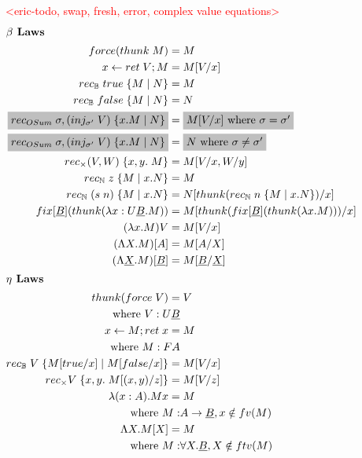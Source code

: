 \documentclass[acmsmall]{acmart}
\newcommand{\eric}[1]{\textcolor{red}{ <eric-#1> }}
\begin{document}
\begin{figure}[H]
  \eric{todo, swap, fresh, error, complex value equations}
  \centering
  \scriptsize
  \begin{align*}
  \intertext{$\textbf{$\beta$ Laws}$}
  force (thunk \; M) =&\; M\\
  x \leftarrow ret \; V; M =&\; M[V/x]\\
  rec_{\mathbb{B}} \; true \; \{M \;|\; N\} =&\; M \\
  rec_{\mathbb{B}} \; false \; \{M \;|\; N\} =&\; N \\
  \colorbox{lightgray}{$rec_{OSum}\; \sigma,(inj_{\sigma'}\;V)\;\{x.M \;|\; N\}$} =&\; \colorbox{lightgray}{$M[V/x] \text{ where } \sigma = \sigma'$}\\
  \colorbox{lightgray}{$rec_{OSum}\; \sigma,(inj_{\sigma'}\;V)\;\{x.M \;|\; N\}$} =&\; \colorbox{lightgray}{$N \text{ where } \sigma \neq \sigma'$}\\
  rec_\times (V,W)\;\{x,y.\;M\} =&\; M[V/x,W/y]\\
  rec_{\mathbb{N}} \; z \; \{M \;|\;x. N\} =&\; M \\
  rec_{\mathbb{N}} \; (s\;n) \; \{M \;|\;x. N\} =&\; N[thunk(rec_{\mathbb{N}} \; n \; \{M \;|\;x. N\})/x] \\
  fix[\underline{B}](thunk(\lambda x : U\underline{B}. M)) =&\;M[thunk(fix[\underline{B}](thunk(\lambda x. M)))/x]\\
  (\lambda x.M)V =&\; M[V/x]\\
  (\Lambda X.M)[A] =&\; M[A/X] \\
  (\Lambda \underline{X}.M)[\underline{B}] =&\; M[\underline{B}/\underline{X}]\\
  \intertext{$\textbf{$\eta$ Laws}$} 
    thunk(force \;V) =&\; V \\
    \text{ where } V : U\underline{B}\\
    x \leftarrow M; ret \; x =&\; M\\
    \text{ where } M : FA \\
    rec_{\mathbb{B}} \; V \; \{M[true/x] \;|\; M[false/x]\} =&\; M[V/x]\\
    rec_\times V\;\{x,y.\;M[(x,y)/z]\}=&\;M[V/z] \\
    \lambda (x :A) . Mx =&\; M  \\\text{ where } M : &A \rightarrow \underline{B}, x \notin fv(M)\\
    \Lambda X. M[X] =&\; M\\
    \text{ where }M : &\forall X. \underline{B}, X \notin ftv(M)\\

\end{align*}
\end{figure}
\end{document}

